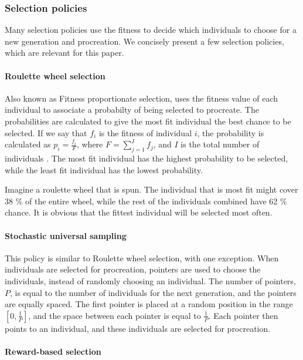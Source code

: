 \subsubsection{Selection policies}
\label{sec:selectionpolicies}

Many selection policies use the fitness to decide which individuals to choose for a new generation and procreation. We concisely present a few selection policies, which are relevant for this paper.

\paragraph{Roulette wheel selection}

Also known as Fitness proportionate selection, uses the fitness value of each individual to associate a probabilty of being selected to procreate. The probabilities are calculated to give the most fit individual the best chance to be selected. If we say that $f_i$ is the fitness of individual $i$, the probability is calculated as $p_i = \frac{f_i}{F}$, where $F = \sum_{j=1}^{I} f_j$, and $I$ is the total number of individuals\cite{tang1996genetic} \cite{koza1992genetic}. The most fit individual has the highest probability to be selected, while the least fit individual has the lowest probability.

Imagine a roulette wheel that is spun. The individual that is most fit might cover 38 \% of the entire wheel, while the rest of the individuals combined have 62 \% chance. It is obvious that the fittest individual will be selected most often.

\paragraph{Stochastic universal sampling}

This policy is similar to Roulette wheel selection, with one exception. When individuals are selected for procreation, pointers are used to choose the individuals, instead of randomly choosing an individual. The number of pointers, $P$, is equal to the number of individuals for the next generation, and the pointers are equally spaced. The first pointer is placed at a random position in the range $[0, \frac{1}{P}]$, and the space between each pointer is equal to $\frac{1}{P}$. Each pointer then points to an individual, and these individuals are selected for procreation\cite{baker1987reducing}.

\paragraph{Reward-based selection}

